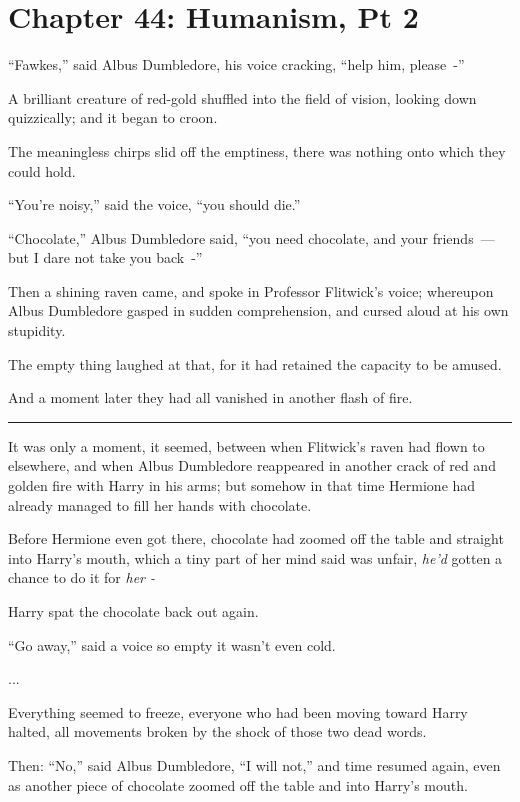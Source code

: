 \chapter{Chapter 44: Humanism, Pt 2}
``Fawkes,'' said Albus Dumbledore, his voice cracking, ``help him, please~-''

A brilliant creature of red-gold shuffled into the field of vision, looking down quizzically; and it began to croon.

The meaningless chirps slid off the emptiness, there was nothing onto which they could hold.

``You're noisy,'' said the voice, ``you should die.''

``Chocolate,'' Albus Dumbledore said, ``you need chocolate, and your friends~--- but I dare not take you back~-''

Then a shining raven came, and spoke in Professor Flitwick's voice; whereupon Albus Dumbledore gasped in sudden comprehension, and cursed aloud at his own stupidity.

The empty thing laughed at that, for it had retained the capacity to be amused.

And a moment later they had all vanished in another flash of fire.

\begin{center}\rule{3in}{0.4pt}\end{center}

It was only a moment, it seemed, between when Flitwick's raven had flown to elsewhere, and when Albus Dumbledore reappeared in another crack of red and golden fire with Harry in his arms; but somehow in that time Hermione had already managed to fill her hands with chocolate.

Before Hermione even got there, chocolate had zoomed off the table and straight into Harry's mouth, which a tiny part of her mind said was unfair, \emph{he'd} gotten a chance to do it for \emph{her -}

Harry spat the chocolate back out again.

``Go away,'' said a voice so empty it wasn't even cold.

...

Everything seemed to freeze, everyone who had been moving toward Harry halted, all movements broken by the shock of those two dead words.

Then: ``No,'' said Albus Dumbledore, ``I will not,'' and time resumed again, even as another piece of chocolate zoomed off the table and into Harry's mouth.

